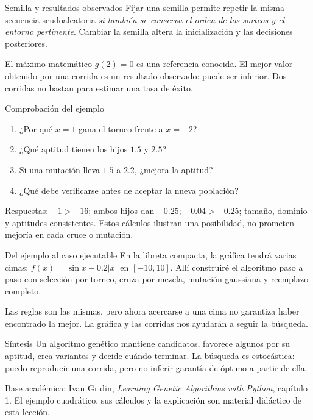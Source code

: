 \begin{frame}{Semilla y resultados observados}
Fijar una semilla permite repetir la misma secuencia seudoaleatoria
\emph{si también se conserva el orden de los sorteos y el entorno pertinente}.
Cambiar la semilla altera la inicialización y las decisiones posteriores.
\medskip

El máximo matemático $g(2)=0$ es una referencia conocida. El mejor valor
obtenido por una corrida es un resultado observado: puede ser inferior.
Dos corridas no bastan para estimar una tasa de éxito.
\end{frame}

\begin{frame}{Comprobación del ejemplo}
\begin{enumerate}
\item ¿Por qué $x=1$ gana el torneo frente a $x=-2$?
\item ¿Qué aptitud tienen los hijos $1.5$ y $2.5$?
\item Si una mutación lleva $1.5$ a $2.2$, ¿mejora la aptitud?
\item ¿Qué debe verificarse antes de aceptar la nueva población?
\end{enumerate}
\medskip
Respuestas: $-1>-16$; ambos hijos dan $-0.25$; $-0.04>-0.25$;
tamaño, dominio y aptitudes consistentes. Estos cálculos ilustran una
posibilidad, no prometen mejoría en cada cruce o mutación.
\end{frame}

\begin{frame}{Del ejemplo al caso ejecutable}
En la libreta compacta, la gráfica tendrá varias cimas:
$f(x)=\sin x-0.2|x|$ en $[-10,10]$. Allí construiré el algoritmo paso a paso
con selección por torneo, cruza por mezcla, mutación gaussiana y reemplazo
completo.
\medskip

Las reglas son las mismas, pero ahora acercarse a una cima no garantiza haber
encontrado la mejor. La gráfica y las corridas nos ayudarán a seguir la búsqueda.
\end{frame}

\begin{frame}{Síntesis}
Un algoritmo genético mantiene candidatos, favorece algunos por su aptitud,
crea variantes y decide cuándo terminar. La búsqueda es estocástica:
puedo reproducir una corrida, pero no inferir garantía de óptimo a partir de ella.
\medskip

\scriptsize Base académica: Ivan Gridin, \emph{Learning Genetic Algorithms with Python},
capítulo 1. El ejemplo cuadrático, sus cálculos y la explicación son material
didáctico de esta lección.
\end{frame}

